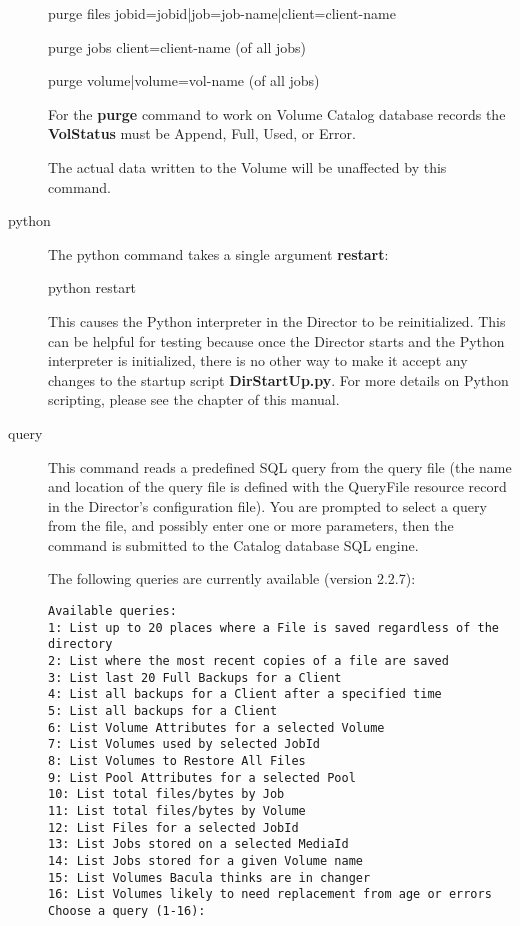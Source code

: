\begin{description}
purge files jobid=\lt{}jobid\gt{}|job=\lt{}job-name\gt{}|client=\lt{}client-name\gt{} 

purge jobs client=\lt{}client-name\gt{} (of all jobs)

purge volume|volume=\lt{}vol-name\gt{} (of all jobs)

For the {\bf purge} command to work on Volume Catalog database  records the
{\bf VolStatus}  must be Append, Full, Used, or Error.  

The actual data written to the Volume will be unaffected by  this command.  

\item[python]
  The python command takes a single argument {\bf restart}:

python restart

   This causes the Python interpreter in the Director to be reinitialized.
   This can be helpful for testing because once the Director starts and the
   Python interpreter is initialized, there is no other way to make it
   accept any changes to the startup script {\bf DirStartUp.py}.  For more
   details on Python scripting, please see the  chapter of this manual.

\item [query]
   This command reads a predefined SQL query from  the query file (the name and
   location of the  query file is defined with the QueryFile resource record in 
   the Director's configuration file). You are prompted to select  a query from
   the file, and possibly enter one or more parameters,  then the command is
   submitted to the Catalog database SQL engine.  

The following queries are currently available (version 2.2.7):  

\footnotesize
\begin{verbatim}
Available queries:
1: List up to 20 places where a File is saved regardless of the directory
2: List where the most recent copies of a file are saved
3: List last 20 Full Backups for a Client
4: List all backups for a Client after a specified time
5: List all backups for a Client
6: List Volume Attributes for a selected Volume
7: List Volumes used by selected JobId
8: List Volumes to Restore All Files
9: List Pool Attributes for a selected Pool
10: List total files/bytes by Job
11: List total files/bytes by Volume
12: List Files for a selected JobId
13: List Jobs stored on a selected MediaId
14: List Jobs stored for a given Volume name
15: List Volumes Bacula thinks are in changer
16: List Volumes likely to need replacement from age or errors
Choose a query (1-16):
\end{verbatim}
\normalsize


\end{description}
